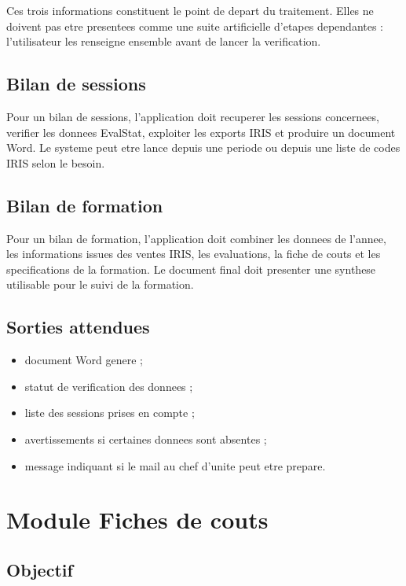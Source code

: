\documentclass[11pt,a4paper]{report}
\begin{document}
Ces trois informations constituent le point de depart du traitement. Elles ne doivent pas etre presentees comme une suite artificielle d'etapes dependantes : l'utilisateur les renseigne ensemble avant de lancer la verification.

\section{Bilan de sessions}

Pour un bilan de sessions, l'application doit recuperer les sessions concernees, verifier les donnees EvalStat, exploiter les exports IRIS et produire un document Word. Le systeme peut etre lance depuis une periode ou depuis une liste de codes IRIS selon le besoin.

\section{Bilan de formation}

Pour un bilan de formation, l'application doit combiner les donnees de l'annee, les informations issues des ventes IRIS, les evaluations, la fiche de couts et les specifications de la formation. Le document final doit presenter une synthese utilisable pour le suivi de la formation.

\section{Sorties attendues}

\begin{itemize}
  \item document Word genere ;
  \item statut de verification des donnees ;
  \item liste des sessions prises en compte ;
  \item avertissements si certaines donnees sont absentes ;
  \item message indiquant si le mail au chef d'unite peut etre prepare.
\end{itemize}

\chapter{Module Fiches de couts}

\section{Objectif}
\end{document}
